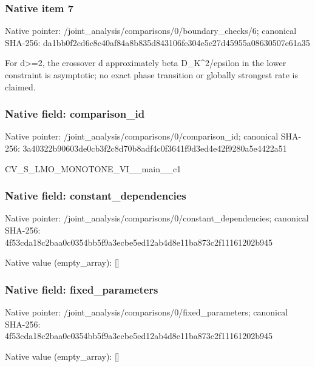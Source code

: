 \documentclass[10pt,a4paper]{article}
\begin{document}
\subsubsection{Native item 7}
Native pointer: /joint\_\allowbreak{}analysis/comparisons/0/boundary\_\allowbreak{}checks/6; canonical SHA-256: da1bb0f2cd6c8c40af84a8b835d843106fe304e5e27d45955a08630507e61a35

\begingroup\raggedright\sloppy For d>=\allowbreak{}2,\allowbreak{} the crossover d approximately beta D\_\allowbreak{}K\textasciicircum{}2/\allowbreak{}epsilon in the lower constraint is asymptotic;\allowbreak{} no exact phase transition or globally strongest rate is claimed.\par\endgroup

\subsubsection{Native field: comparison\_\allowbreak{}id}
Native pointer: /joint\_\allowbreak{}analysis/comparisons/0/comparison\_\allowbreak{}id; canonical SHA-256: 3a40322b90603de0cb3f2c8d70b8adf4c0f3641f9d3ed4e42f9280a5e4422a51

\begingroup\raggedright\sloppy CV\_\allowbreak{}S\_\allowbreak{}LMO\_\allowbreak{}MONOTONE\_\allowbreak{}VI\_\allowbreak{}\_\allowbreak{}main\_\allowbreak{}\_\allowbreak{}c1\par\endgroup

\subsubsection{Native field: constant\_\allowbreak{}dependencies}
Native pointer: /joint\_\allowbreak{}analysis/comparisons/0/constant\_\allowbreak{}dependencies; canonical SHA-256: 4f53cda18c2baa0c0354bb5f9a3ecbe5ed12ab4d8e11ba873c2f11161202b945

Native value (empty\_\allowbreak{}array): []

\subsubsection{Native field: fixed\_\allowbreak{}parameters}
Native pointer: /joint\_\allowbreak{}analysis/comparisons/0/fixed\_\allowbreak{}parameters; canonical SHA-256: 4f53cda18c2baa0c0354bb5f9a3ecbe5ed12ab4d8e11ba873c2f11161202b945

Native value (empty\_\allowbreak{}array): []
\end{document}
